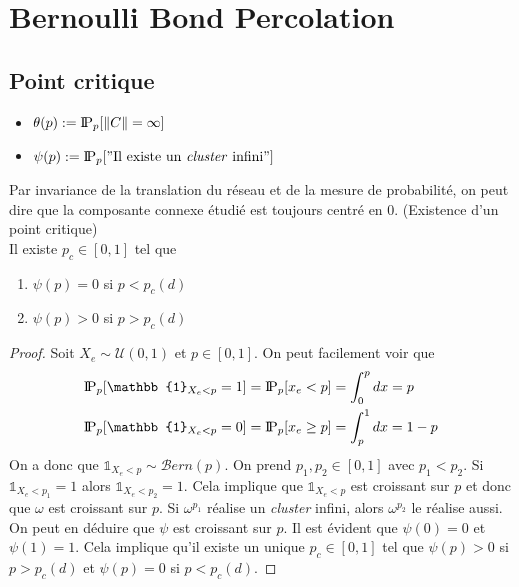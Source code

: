 \section{Bernoulli Bond Percolation}
\subsection{Point critique}
\begin{itemize}[label=\textbullet, left=0pt]
    \item $\theta(p) :=\text{I\kern-0.15em P}_p[\lVert C \rVert = \infty] $
    \item $\psi(p) :=\text{I\kern-0.15em P}_p["\text{Il existe un \textit{cluster} infini}"] $
\end{itemize}
Par invariance de la translation du réseau et de la mesure de probabilité, on peut dire que la composante connexe étudié est toujours centré en 0. 
\proposition(Existence d'un point critique)\\[10pt]\label{thm:existence}
Il existe $p_c \in [0,1]$ tel que
\begin{enumerate}[label=\roman*)]
    \item $ \psi(p) = 0$ si $p < p_c(d) $\\[0pt]
    \item $ \psi(p) >0$ si $p > p_c(d) $\\
\end{enumerate}
\begin{proof}
    Soit $X_e \sim \mathcal{U}(0,1)$ et $p \in [0,1]$. On peut facilement voir que
    \begin{align*}
        \probP_p[\mathbb{1}_{X_e<p} = 1]&= \probP_p[x_e<p] = \int_{0}^{p}dx = p\\
        \probP_p[\mathbb{1}_{X_e<p} = 0]&= \probP_p[x_e\geq p]=\int_{p}^{1}dx =  1- p
    \end{align*}
    On a donc que $\mathbb{1}_{X_e<p}\sim \mathcal{B}ern(p)$.
    On prend $p_1,p_2 \in [0,1] $ avec $p_1<p_2$.
    Si $\mathbb{1}_{X_e<p_1} = 1$ alors $\mathbb{1}_{X_e<p_2} =1$. Cela implique que $\mathbb{1}_{X_e<p}$ est croissant sur $p$ et donc que $\omega$ est croissant sur $p$. 
    Si $\omega^{p_1}$ réalise un \textit{cluster} infini, alors $\omega^{p_2}$  le réalise aussi. 
    On peut en déduire que $\psi$ est croissant sur $p$.
    Il est évident que $\psi (0) = 0$ et $\psi(1)=1$. 
    Cela implique qu'il existe un unique $p_c \in [0,1]$ tel que $\psi(p) >0$ si $p > p_c(d)$ et $\psi(p) = 0$ si $p < p_c(d)$.
\end{proof}


